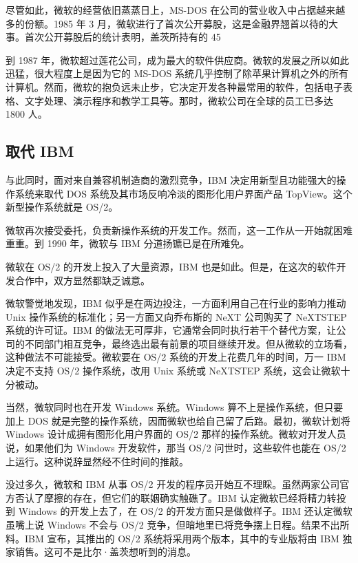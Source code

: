 \documentclass[12pt,UTF8]{ctexbook}
\begin{document}
尽管如此，微软的经营依旧蒸蒸日上，MS-DOS 在公司的营业收入中占据越来越多的份额。1985 年 3 月，微软进行了首次公开募股，这是金融界翘首以待的大事。首次公开募股后的统计表明，盖茨所持有的 45%

到 1987 年，微软超过莲花公司，成为最大的软件供应商。微软的发展之所以如此迅猛，很大程度上是因为它的 MS-DOS 系统几乎控制了除苹果计算机之外的所有计算机。然而，微软的抱负远未止步，它决定开发各种最常用的软件，包括电子表格、文字处理、演示程序和教学工具等。那时，微软公司在全球的员工已多达 1800 人。





\subsection{取代 IBM}


与此同时，面对来自兼容机制造商的激烈竞争，IBM 决定用新型且功能强大的操作系统来取代 DOS 系统及其市场反响冷淡的图形化用户界面产品 TopView。这个新型操作系统就是 OS/2。

微软再次接受委托，负责新操作系统的开发工作。然而，这一工作从一开始就困难重重。到 1990 年，微软与 IBM 分道扬镳已是在所难免。

微软在 OS/2 的开发上投入了大量资源，IBM 也是如此。但是，在这次的软件开发合作中，双方显然都缺乏诚意。

微软警觉地发现，IBM 似乎是在两边投注，一方面利用自己在行业的影响力推动 Unix 操作系统的标准化；另一方面又向乔布斯的 NeXT 公司购买了 NeXTSTEP 系统的许可证。IBM 的做法无可厚非，它通常会同时执行若干个替代方案，让公司的不同部门相互竞争，最终选出最有前景的项目继续开发。但从微软的立场看，这种做法不可能接受。微软要在 OS/2 系统的开发上花费几年的时间，万一 IBM 决定不支持 OS/2 操作系统，改用 Unix 系统或 NeXTSTEP 系统，这会让微软十分被动。

当然，微软同时也在开发 Windows 系统。Windows 算不上是操作系统，但只要加上 DOS 就是完整的操作系统，因而微软也给自己留了后路。最初，微软计划将 Windows 设计成拥有图形化用户界面的 OS/2 那样的操作系统。微软对开发人员说，如果他们为 Windows 开发软件，那当 OS/2 问世时，这些软件也能在 OS/2 上运行。这种说辞显然经不住时间的推敲。

没过多久，微软和 IBM 从事 OS/2 开发的程序员开始互不理睬。虽然两家公司官方否认了摩擦的存在，但它们的联姻确实触礁了。IBM 认定微软已经将精力转投到 Windows 的开发上去了，在 OS/2 的开发方面只是做做样子。IBM 还认定微软虽嘴上说 Windows 不会与 OS/2 竞争，但暗地里已将竞争摆上日程。结果不出所料。IBM 宣布，其推出的 OS/2 系统将采用两个版本，其中的专业版将由 IBM 独家销售。这可不是比尔·盖茨想听到的消息。
\end{document}

